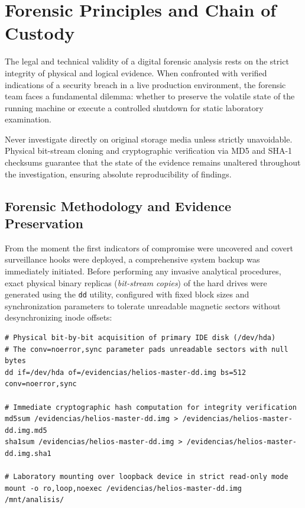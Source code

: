 \chapter{Forensic Principles and Chain of Custody}

The legal and technical validity of a digital forensic analysis rests on the strict integrity of physical and logical evidence. When confronted with verified indications of a security breach in a live production environment, the forensic team faces a fundamental dilemma: whether to preserve the volatile state of the running machine or execute a controlled shutdown for static laboratory examination.

\begin{notaforense}
Never investigate directly on original storage media unless strictly unavoidable. Physical bit-stream cloning and cryptographic verification via MD5 and SHA-1 checksums guarantee that the state of the evidence remains unaltered throughout the investigation, ensuring absolute reproducibility of findings.
\end{notaforense}

\section{Forensic Methodology and Evidence Preservation}

From the moment the first indicators of compromise were uncovered and covert surveillance hooks were deployed, a comprehensive system backup was immediately initiated. Before performing any invasive analytical procedures, exact physical binary replicas (\textit{bit-stream copies}) of the hard drives were generated using the \texttt{dd} utility, configured with fixed block sizes and synchronization parameters to tolerate unreadable magnetic sectors without desynchronizing inode offsets:

\begin{lstlisting}[style=terminal]
# Physical bit-by-bit acquisition of primary IDE disk (/dev/hda)
# The conv=noerror,sync parameter pads unreadable sectors with null bytes
dd if=/dev/hda of=/evidencias/helios-master-dd.img bs=512 conv=noerror,sync

# Immediate cryptographic hash computation for integrity verification
md5sum /evidencias/helios-master-dd.img > /evidencias/helios-master-dd.img.md5
sha1sum /evidencias/helios-master-dd.img > /evidencias/helios-master-dd.img.sha1

# Laboratory mounting over loopback device in strict read-only mode
mount -o ro,loop,noexec /evidencias/helios-master-dd.img /mnt/analisis/
\end{lstlisting}

